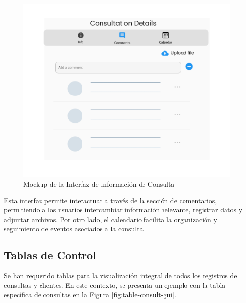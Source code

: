 \begin{figure}[H]
\centering
\includegraphics[width=1\linewidth]{fig/comment-gui.png}
\caption{Mockup de la Interfaz de Información de Consulta}
\label{fig:info-consult-gui}
\end{figure}

Esta interfaz permite interactuar a través de la sección de comentarios, permitiendo a los usuarios intercambiar información relevante, registrar datos y adjuntar archivos. Por otro lado, el calendario facilita la organización y seguimiento de eventos asociados a la consulta.

\subsection{Tablas de Control}

Se han requerido tablas para la visualización integral de todos los registros de consultas y clientes. En este contexto, se presenta un ejemplo con la tabla específica de consultas en la Figura \ref{fig:table-consult-gui}.

